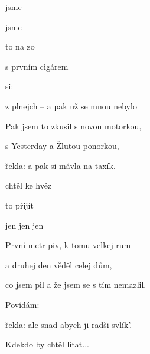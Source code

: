 

\zr
{} jsme 

 jsme 

 to  na zo
\kr

\zs
{} s prvním cigárem

 si: 

z plnejch  -- a pak už se mnou nebylo 
\ks

\zs
Pak jsem to zkusil s novou motorkou,

s Yesterday a Žlutou ponorkou,

řekla:  a pak si mávla na taxík.
\ks

\zs
{} chtěl  ke hvěz

 to  přijít 

jen  jen  jen 
\ks

\zr
\kr

\zs
První metr piv, k tomu velkej rum

a druhej den věděl celej dům,

co jsem pil a že jsem se s tím nemazlil.
\ks

\zs
Povídám: 

řekla:  ale snad abych ji radši svlík'.
\ks

\zs
Kdekdo by chtěl lítat...
\ks

\zr
\kr

\zr
\kr

\kp
